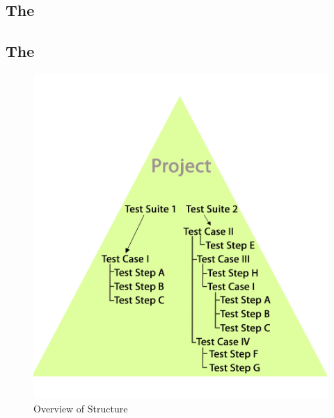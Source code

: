 


\subsection{The \gdclient}


\subsection{The \gdserver}


\begin{figure}[p]
\includegraphics{GettingStarted/Structure/PS/pyramide}
\caption{Overview of \gdproject Structure}
\label{pyramide}
\end{figure}
